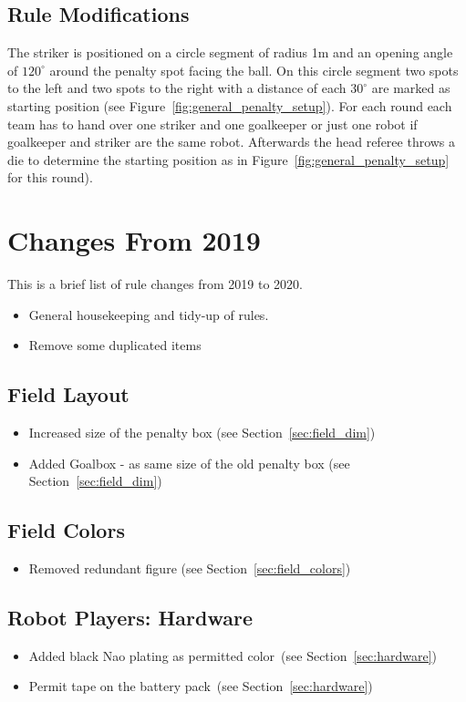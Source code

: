 \documentclass[12pt]{article}
\newcommand{\cf}{see\xspace}
\begin{document}
\subsection{Rule Modifications}
The striker is positioned on a circle segment of radius 1m and an opening angle of $120^\circ$ around the penalty spot facing the ball. On this circle segment two spots to the left and two spots to the right with a distance of each $30^\circ$ are marked as starting position (see Figure~\ref{fig:general_penalty_setup}). For each round each team has to hand over one striker and one goalkeeper or just one robot if goalkeeper and striker are the same robot. Afterwards the head referee throws a die to determine the starting position as in Figure~\ref{fig:general_penalty_setup} for this round).

\newpage
\section{Changes From 2019}
This is a brief list of rule changes from 2019 to 2020.

\begin{itemize}
  \item General housekeeping and tidy-up of rules.
  \item Remove some duplicated items
\end{itemize}

\subsection*{Field Layout}
\begin{itemize}
  \item Increased size of the penalty box (\cf Section~\ref{sec:field_dim})
  \item Added Goalbox - as same size of the old penalty box (\cf Section~\ref{sec:field_dim})
\end{itemize}

\subsection*{Field Colors}
\begin{itemize}
  \item Removed redundant figure (\cf Section~\ref{sec:field_colors})
\end{itemize}

\subsection*{Robot Players: Hardware}
\begin{itemize}
  \item Added black Nao plating as permitted color~(\cf Section~\ref{sec:hardware})
  \item Permit tape on the battery pack~(\cf Section~\ref{sec:hardware})
\end{itemize}
\end{document}
